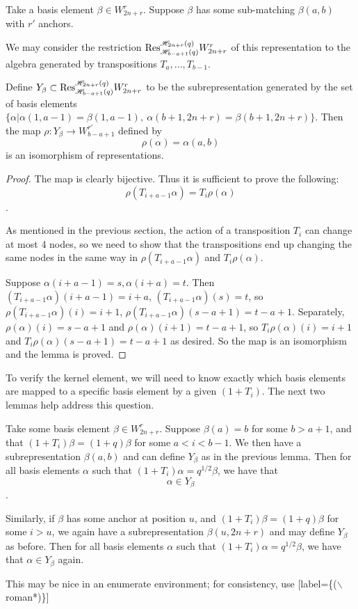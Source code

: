 \documentclass{amsart}
\begin{document}
\begin{lemma}
	Take a basis element $\beta\in W_{2n+r}^r$. Suppose $\beta$ has some sub-matching $\beta(a,b)$ with $r'$ anchors. 
	
	We may consider the restriction $\text{Res}_{\mathscr{H}_{b-a+1}(q)}^{\mathscr{H}_{2n+r}(q)}W_{2n+r}^r$ of this representation to the algebra generated by transpositions $T_a,...,T_{b-1}$. 
	
	Define $Y_\beta\subset \text{Res}_{\mathscr{H}_{b-a+1}(q)}^{\mathscr{H}_{2n+r}(q)}W_{2n+r}^r$ to be the subrepresentation generated by the set of basis elements $\{\alpha| \alpha(1,a-1)=\beta(1,a-1),\ \alpha(b+1,2n+r)=\beta(b+1,2n+r)\}$. Then the map $\rho:Y_\beta\rightarrow W_{b-a+1}^{r'}$ defined by $$\rho(\alpha)=\alpha(a,b)$$ is an isomorphism of representations.
\end{lemma}

\vspace{5mm}
\begin{proof}
	
	The map is clearly bijective. Thus it is sufficient to prove the following: $$\rho(T_{i+a-1}\alpha)=T_i\rho(\alpha)$$.
	
	As mentioned in the previous section, the action of a transposition $T_i$ can change at most 4 nodes, so we need to show that the transpositions end up changing the same nodes in the same way in  $\rho(T_{i+a-1}\alpha)$ and $T_i\rho(\alpha)$.
	
	Suppose $\alpha(i+a-1)=s,\alpha(i+a)=t$. Then $(T_{i+a-1}\alpha)(i+a-1)=i+a$, $(T_{i+a-1}\alpha)(s)=t$, so $\rho(T_{i+a-1}\alpha)(i)=i+1$, $\rho(T_{i+a-1}\alpha)(s-a+1)=t-a+1$. Separately, $\rho(\alpha)(i)=s-a+1$ and $\rho(\alpha)(i+1)=t-a+1$, so $T_i\rho(\alpha)(i)=i+1$ and $T_i\rho(\alpha)(s-a+1)=t-a+1$ as desired. So the map is an isomorphism and the lemma is proved.
\end{proof}

\vspace{5mm}
To verify the kernel element, we will need to know exactly which basis elements are mapped to a specific basis element by a given $(1+T_i)$. The next two lemmas help address this question.

\begin{lemma}
	Take some basis element $\beta\in W_{2n+r}^r$. Suppose $\beta(a)=b$ for some $b>a+1$, and that $(1+T_i)\beta=(1+q)\beta$ for some $a<i<b-1$. We then have a subrepresentation $\beta(a,b)$ and can define $Y_\beta$ as in the previous lemma. Then for all basis elements $\alpha$ such that $(1+T_i)\alpha=q^{1/2}\beta$, we have that $$\alpha\in Y_\beta$$.
	
	Similarly, if $\beta$ has some anchor at position $u$, and $(1+T_i)\beta=(1+q)\beta$ for some $i>u$, we again have a subrepresentation $\beta(u,2n+r)$ and may define $Y_\beta$ as before. Then for all basis elements $\alpha$ such that $(1+T_i)\alpha=q^{1/2}\beta$, we have that $\alpha\in Y_\beta$ again.
\end{lemma}
{\color{magenta} This may be nice in an enumerate environment;
for consistency, use [label=\{($\backslash$roman*)\}]}
\end{document}

